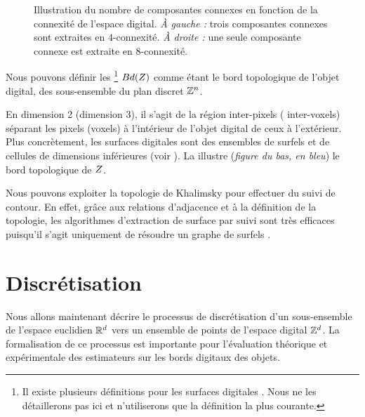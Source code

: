 \begin{figure}[ht]
  \begin{center}
    
  \end{center}
  \caption[Illustration du nombre de composantes connexes en fonction de la connexité de l'espace digital.]
  {Illustration du nombre de composantes connexes en fonction de la connexité de
  l'espace digital. \emph{À gauche :} trois composantes connexes sont extraites
  en $4$-connexité. \emph{À droite :} une seule composante connexe est extraite
  en $8$-connexité.\label{fig:connexite}}
\end{figure}


Nous pouvons définir les \footnote{Il existe
plusieurs définitions pour les surfaces digitales \cite{Rosenfeld1979,
Latecki1995}. Nous ne les détaillerons pas ici et n'utiliserons que la
définition la plus courante.} $Bd(Z)$ comme étant le bord
topologique de l'objet digital, \cad des sous-ensemble du plan discret $\mathbb{Z}^n$.



En dimension 2 (\respp dimension 3), il s'agit de la région inter-pixels (\resp
inter-voxels) séparant les pixels (\resp voxels) à l'intérieur de l'objet
digital de ceux à l'extérieur. Plus concrètement, les surfaces digitales sont
des ensembles de surfels et de cellules de dimensions inférieures  (voir \cite{Herman1998, Udupa1994, Kong1992}). La
 illustre (\emph{figure du bas, en bleu}) le bord
topologique de $Z$.

%     

Nous pouvons exploiter la topologie de Khalimsky pour effectuer du suivi de
contour. En effet, grâce aux relations d'adjacence et à la définition de la
topologie, les algorithmes d'extraction de surface par suivi sont très efficaces
puisqu'il s'agit uniquement de résoudre un graphe de surfels \cite{Lachaud1998ICIP,Lachaud2000129}.

%
\section{Discrétisation}
\label{sec:digitization}
%
Nous allons maintenant décrire le processus de discrétisation d'un sous-ensemble
de l'espace euclidien $\mathbb{R}^d$ vers un ensemble de points de l'espace digital
$\mathbb{Z}^d$. La formalisation de ce processus est importante pour l'évaluation
théorique et expérimentale des estimateurs sur les bords digitaux des objets.


